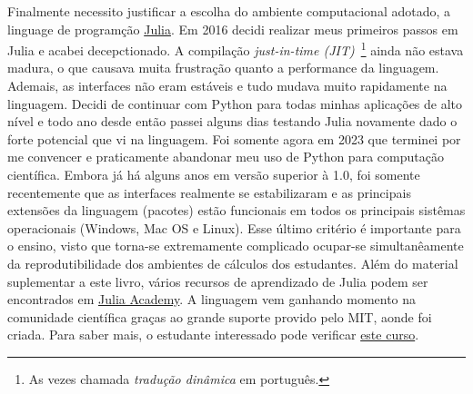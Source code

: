 Finalmente necessito justificar a escolha do ambiente computacional adotado, a linguage de programção \href{https://julialang.org/}{Julia}. Em 2016 decidi realizar meus primeiros passos em Julia e acabei decepctionado. A compilação \emph{just-in-time (JIT)}~\footnote{As vezes chamada \emph{tradução dinâmica} em português.} ainda não estava madura, o que causava muita frustração quanto a performance da linguagem. Ademais, as interfaces não eram estáveis e tudo mudava muito rapidamente na linguagem. Decidi de continuar com Python para todas minhas aplicações de alto nível e todo ano desde então passei alguns dias testando Julia novamente dado o forte potencial que vi na linguagem. Foi somente agora em 2023 que terminei por me convencer e praticamente abandonar meu uso de Python para computação científica. Embora já há alguns anos em versão superior à 1.0, foi somente recentemente que as interfaces realmente se estabilizaram e as principais extensões da linguagem (pacotes) estão funcionais em todos os principais sistêmas operacionais (Windows, Mac OS e Linux). Esse último critério é importante para o ensino, visto que torna-se extremamente complicado ocupar-se simultanêamente da reprodutibilidade dos ambientes de cálculos dos estudantes. Além do material suplementar a este livro, vários recursos de aprendizado de Julia podem ser encontrados em \href{https://juliaacademy.com/}{Julia Academy}. A linguagem vem ganhando momento na comunidade científica graças ao grande suporte provido pelo MIT, aonde foi criada. Para saber mais, o estudante interessado pode verificar \href{https://computationalthinking.mit.edu/}{este curso}.



\endinput%
